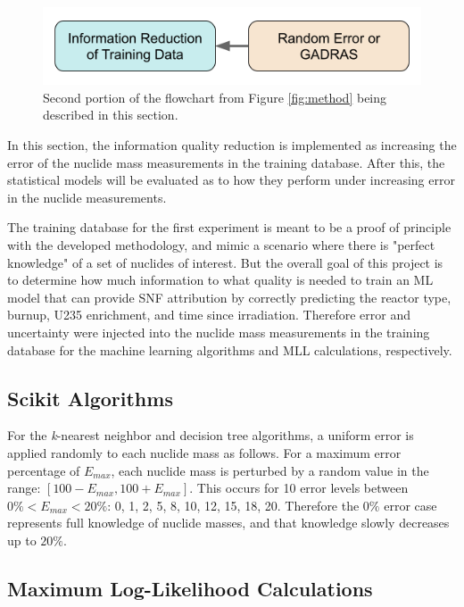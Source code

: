 \begin{figure}[H]
  \centering
  \includegraphics[width=0.7\linewidth]{./chapters/exp1/methodology2.png}
  \caption{Second portion of the flowchart from Figure \ref{fig:method} being 
           described in this section.}
\end{figure}

In this section, the information quality reduction is implemented as increasing
the error of the nuclide mass measurements in the training database. After
this, the statistical models will be evaluated as to how they perform under
increasing error in the nuclide measurements. 

The training database for the first experiment is meant to be a proof of
principle with the developed methodology, and mimic a scenario where there is
"perfect knowledge" of a set of nuclides of interest.  But the overall goal of
this project is to determine how much information to what quality is needed to
train an \gls{ML} model that can provide \gls{SNF} attribution by correctly
predicting the reactor type, burnup, \gls{U235} enrichment, and time since
irradiation.  Therefore error and uncertainty were injected into the nuclide
mass measurements in the training database for the machine learning algorithms
and \gls{MLL} calculations, respectively. 

\subsection{Scikit Algorithms}

For the \textit{k}-nearest neighbor and decision tree algorithms, a uniform
error is applied randomly to each nuclide mass as follows.  For a maximum error
percentage of $E_{max}$, each nuclide mass is perturbed by a random value in the
range: $[100-E_{max},100+E_{max}]$.  This occurs for 10 error levels between
$0\% < E_{max} < 20\%$: 0, 1, 2, 5, 8, 10, 12, 15, 18, 20. Therefore the $0\%$
error case represents full knowledge of nuclide masses, and that knowledge
slowly decreases up to $20\%$. 

\subsection{Maximum Log-Likelihood Calculations}

